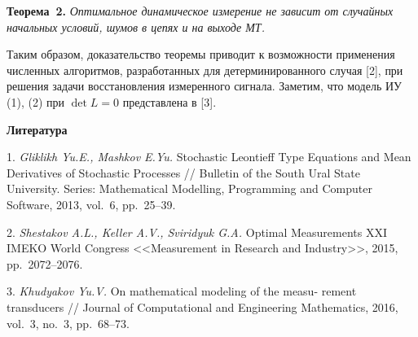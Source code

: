 \textbf{Теорема~2.} {\it 	
Оптимальное динамическое измерение не зависит от случайных начальных условий, шумов в цепях и на выходе МТ.	
	 }
	
Таким образом, доказательство теоремы приводит к возможности применения численных алгоритмов, разработанных для детерминированного случая [2], при решения задачи восстановления измеренного сигнала.  Заметим, что модель ИУ (1), (2) при $\det L=0$ представлена в [3].


\smallskip \centerline {\bf Литература} \nopagebreak

1. {\it Gliklikh Yu.E., Mashkov E.Yu.} Stochastic Leontieff Type Equations and Mean Derivatives of Stochastic Processes // Bulletin of the South Ural State University. Series: Mathematical Modelling, Programming and Computer Software,  2013, vol.~6, pp.~25--39.

2. {\it Shestakov A.L., Keller A.V., Sviridyuk G.A.} Optimal Measurements XXI IMEKO World Congress <<Measurement in Research and Industry>>, 2015, pp.~2072--2076.

3. {\it Khudyakov Yu.V.} On mathematical modeling of the measu- \- rement transducers
// Journal of Computational and Engineering Mathematics, 2016, vol.~3, no.~3, pp.~68--73.



% 